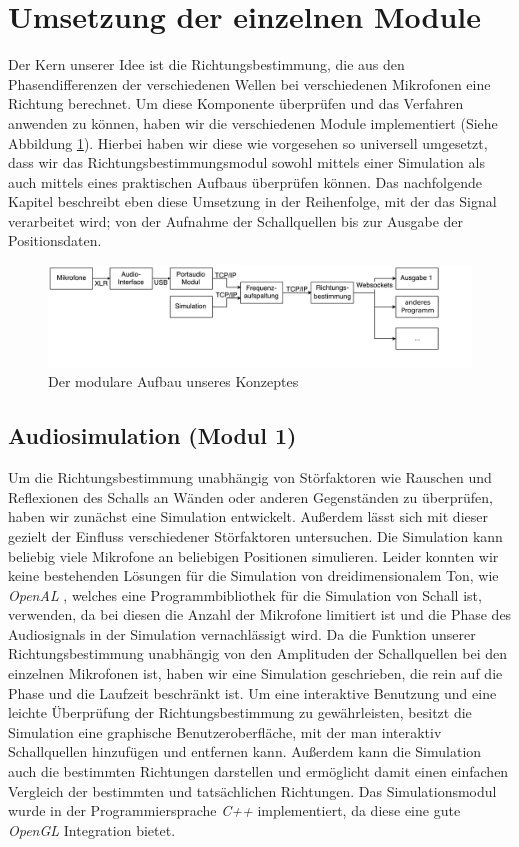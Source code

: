 \section{Umsetzung der einzelnen Module}
Der Kern unserer Idee ist die Richtungsbestimmung, die aus den Phasendifferenzen der verschiedenen Wellen bei verschiedenen Mikrofonen eine Richtung berechnet. Um diese Komponente überprüfen und das Verfahren anwenden zu können, haben wir die verschiedenen Module implementiert (Siehe Abbildung \ref{fig:flowchart}). Hierbei haben wir diese wie vorgesehen so universell umgesetzt, dass wir das Richtungsbestimmungsmodul sowohl mittels einer Simulation als auch mittels eines praktischen Aufbaus überprüfen können. Das nachfolgende Kapitel beschreibt eben diese Umsetzung in der Reihenfolge, mit der das Signal verarbeitet wird; von der Aufnahme der Schallquellen bis zur Ausgabe der Positionsdaten.
\begin{figure}[H]
	\includegraphics[width=\linewidth]{img/flowchart}
	\caption{Der modulare Aufbau unseres Konzeptes}
	\label{fig:flowchart}
\end{figure}

\subsection{Audiosimulation (Modul 1)}
Um die Richtungsbestimmung unabhängig von Störfaktoren wie Rauschen und Reflexionen des Schalls an Wänden oder anderen Gegenständen zu überprüfen, haben wir zunächst eine Simulation entwickelt. Außerdem lässt sich mit dieser gezielt der Einfluss verschiedener Störfaktoren untersuchen. Die Simulation kann beliebig viele Mikrofone an beliebigen Positionen simulieren. Leider konnten wir keine bestehenden Lösungen für die Simulation von dreidimensionalem Ton, wie \textit{OpenAL} \cite{OpenAL}, welches eine Programmbibliothek für die Simulation von Schall ist, verwenden, da bei diesen die Anzahl der Mikrofone limitiert ist und die Phase des Audiosignals in der Simulation vernachlässigt wird. Da die Funktion unserer Richtungsbestimmung unabhängig von den Amplituden der Schallquellen bei den einzelnen Mikrofonen ist, haben wir eine Simulation geschrieben, die rein auf die Phase und die Laufzeit beschränkt ist. Um eine interaktive Benutzung und eine leichte Überprüfung der Richtungsbestimmung zu gewährleisten, besitzt die Simulation eine graphische Benutzeroberfläche, mit der man interaktiv Schallquellen hinzufügen und entfernen kann. Außerdem kann die Simulation auch die bestimmten Richtungen darstellen und ermöglicht damit einen einfachen Vergleich der bestimmten und tatsächlichen Richtungen. Das Simulationsmodul wurde in der Programmiersprache \textit{C++} implementiert, da diese eine gute \textit{OpenGL} Integration bietet.

